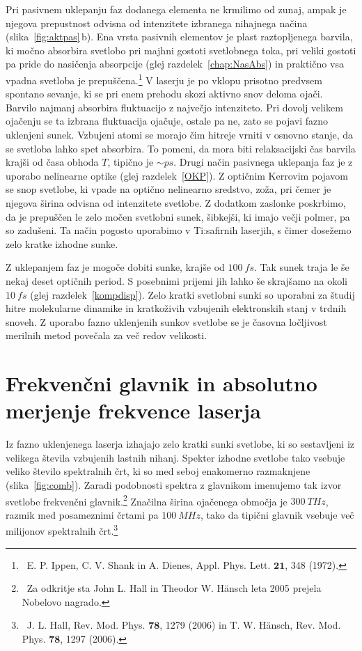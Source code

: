 Pri pasivnem uklepanju faz dodanega elementa ne krmilimo od zunaj, 
ampak je njegova prepustnost odvisna od intenzitete
izbranega nihajnega načina (slika~\ref{fig:aktpas}\,b). 
Ena vrsta pasivnih elementov je plast raztopljenega
barvila, ki močno absorbira svetlobo pri majhni gostoti svetlobnega toka, pri veliki 
gostoti pa pride do nasičenja absorpcije (glej
razdelek~\ref{chap:NasAbs}) in praktično vsa vpadna svetloba je 
prepuščena.\footnote{~E. P. Ippen, C. V. Shank in A. Dienes, Appl. Phys. Lett. $\mathbf{21}$, 348 (1972).} 
V laserju je po vklopu prisotno predvsem 
spontano sevanje, ki se pri enem prehodu skozi aktivno snov deloma ojači. 
Barvilo najmanj absorbira fluktuacijo z največjo intenziteto. Pri dovolj 
velikem ojačenju se ta izbrana fluktuacija ojačuje, ostale pa ne, zato
se pojavi fazno uklenjeni sunek. Vzbujeni atomi se morajo čim hitreje
vrniti v osnovno stanje, da se svetloba lahko spet absorbira. To pomeni, da
 mora biti relaksacijski čas barvila  krajši od časa
obhoda $T$, tipično je $\sim \si{ps}$. 
\newpage
Drugi način pasivnega uklepanja faz je z uporabo nelinearne optike 
(glej 
razdelek~\ref{OKP}). Z optičnim Kerrovim pojavom se snop svetlobe, ki vpade na 
optično nelinearno sredstvo, zoža, pri čemer je njegova širina odvisna od 
intenzitete svetlobe. Z dodatkom zaslonke poskrbimo, 
da je prepuščen le zelo močen svetlobni sunek, šibkejši, ki imajo večji polmer,
pa so zadušeni. Ta način pogosto
uporabimo v Ti:safirnih laserjih, s čimer dosežemo zelo
kratke izhodne sunke.

Z uklepanjem faz je mogoče dobiti sunke, krajše od $100~\si{fs}$. 
Tak sunek traja le še nekaj deset optičnih period. S posebnimi prijemi 
jih lahko še skrajšamo na okoli $10~\si{fs}$ (glej razdelek~\ref{kompdisp}). 
Zelo kratki svetlobni sunki so uporabni za študij hitre molekularne dinamike 
in kratkoživih vzbujenih elektronskih stanj v trdnih snoveh. Z uporabo fazno
uklenjenih sunkov svetlobe se je časovna ločljivost merilnih metod povečala za 
več redov velikosti.

\section{Frekvenčni glavnik in absolutno merjenje frekvence laserja}
Iz fazno uklenjenega laserja izhajajo zelo kratki sunki svetlobe, ki 
so sestavljeni iz velikega števila vzbujenih lastnih nihanj. Spekter 
izhodne svetlobe tako vsebuje veliko število spektralnih črt, ki
so med seboj enakomerno razmaknjene (slika~\ref{fig:comb}). Zaradi podobnosti spektra
z glavnikom imenujemo tak izvor svetlobe frekvenčni glavnik.\footnote{~Za odkritje 
sta John L. Hall in Theodor W. H\"ansch leta 2005 prejela 
Nobelovo nagrado.} Značilna širina ojačenega
območja je $300~\si{THz}$, razmik med posameznimi črtami pa $100~\si{MHz}$, tako 
da tipični glavnik vsebuje več milijonov spektralnih črt.\footnote{~J. 
L. Hall, Rev. Mod. Phys. $\mathbf{78}$, 1279 (2006) in 
T. W. H\"ansch, Rev. Mod. Phys. $\mathbf{78}$, 1297 (2006).}

